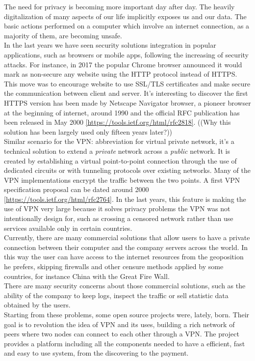 \documentclass[]{article}
\begin{document}
	The need for privacy is becoming more important day after day. The heavily digitalization of many aspects of our life implicitly exposes  us and our data. The basic actions performed on a computer which involve an internet connection, as a majority of them, are becoming unsafe.\\
	In the last years we have seen security solutions integration in popular applications, such as browsers or mobile apps, following the increasing of security attacks. For instance, in 2017 the popular Chrome browser announced it would mark as non-secure any website using the HTTP protocol instead of HTTPS. This move was to encourage website to use SSL/TLS certificates and make secure the communication between client and server. It's interesting to discover the first HTTPS version has been made by Netscape Navigator browser, a pioneer browser at the beginning of internet, around 1990 and the official RFC publication has been released in May 2000 \ref{https://tools.ietf.org/html/rfc2818}. ((Why this solution has been largely used only fifteen years later?))\\	
	Similar scenario for the VPN: abbreviation for virtual private network, it's a technical solution to extend a \textit{private} network across a \textit{public} network. It is created by establishing a virtual point-to-point connection through the use of dedicated circuits or with tunneling protocols over existing networks. Many of the VPN implementations encrypt the traffic between the two points. A first VPN specification proposal can be dated around 2000 \ref{https://tools.ietf.org/html/rfc2764}. In the last years, this feature is making the use of VPN very large because it solves privacy problems the VPN was not intentionally design for, such as crossing a censored network rather than use services available only in certain countries.\\
	Currently, there are many commercial solutions that allow users to have a private connection between their computer and the company servers across the world. In this way the user can have access to the internet resources from the geoposition he prefers, skipping firewalls and other censure methods applied by some countries, for instance China with the Great Fire Wall.\\
	There are many security concerns about those commercial solutions, such as the ability of the company to keep logs, inspect the traffic or sell statistic data obtained by the users.\\
	Starting from these problems, some open source projects were, lately, born. Their goal is to revolution the idea of VPN and its uses, building a rich network of peers where two nodes can connect to each other through a VPN. The project provides a platform including all the components needed to have a efficient, fast and easy to use system, from the discovering to the payment.\\
	
\end{document}
